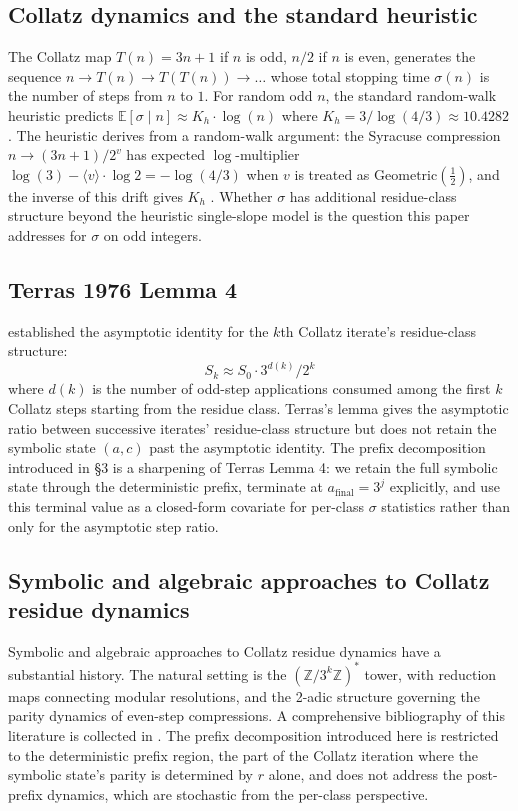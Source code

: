 \documentclass{article}
\theoremstyle{plain}
\begin{document}
\subsection{Collatz dynamics and the standard heuristic}
The Collatz map $T(n) = 3n + 1$ if $n$ is odd, $n/2$ if $n$ is even, generates the sequence $n \rightarrow T(n) \rightarrow T(T(n)) \rightarrow \ldots$ whose total stopping time $\sigma(n)$ is the number of steps from $n$ to $1$. For random odd $n$, the standard random-walk heuristic predicts $\mathbb{E}[\sigma \mid n] \approx K_h \cdot \log(n)$ where $K_h = 3/ \log(4/3) \approx 10.4282$ \citep{lagarias1985}. The heuristic derives from a random-walk argument: the Syracuse compression $n \rightarrow (3n + 1)/2^v$ has expected $\log$-multiplier $\log(3) - \langle v \rangle \cdot \log 2 = - \log(4/3)$ when $v$ is treated as $\text{Geometric}(\frac{1}{2})$, and the inverse of this drift gives $K_h$ \citep{lagarias2010}. Whether $\sigma$ has additional residue-class structure beyond the heuristic single-slope model is the question this paper addresses for $\sigma$ on odd integers.

\subsection{Terras 1976 Lemma 4}
\citet{terras1976} established the asymptotic identity for the $k$th Collatz iterate's residue-class structure: $$S_k \approx S_0 \cdot 3^{d(k)}/2^k$$ where $d(k)$ is the number of odd-step applications consumed among the first $k$ Collatz steps starting from the residue class. Terras's lemma gives the asymptotic ratio between successive iterates' residue-class structure but does not retain the symbolic state $(a, c)$ past the asymptotic identity. The prefix decomposition introduced in \S3 is a sharpening of Terras Lemma 4: we retain the full symbolic state through the deterministic prefix, terminate at $a_{\text{final}} = 3^j$ explicitly, and use this terminal value as a closed-form covariate for per-class $\sigma$ statistics rather than only for the asymptotic step ratio.

\subsection{Symbolic and algebraic approaches to Collatz residue dynamics}
Symbolic and algebraic approaches to Collatz residue dynamics have a substantial history. The natural setting is the $(\mathbb{Z}/3^k\mathbb{Z})^*$ tower, with reduction maps connecting modular resolutions, and the 2-adic structure governing the parity dynamics of even-step compressions. A comprehensive bibliography of this literature is collected in \citet{lagarias2010}. The prefix decomposition introduced here is restricted to the deterministic prefix region, the part of the Collatz iteration where the symbolic state's parity is determined by $r$ alone, and does not address the post-prefix dynamics, which are stochastic from the per-class perspective.
\end{document}
